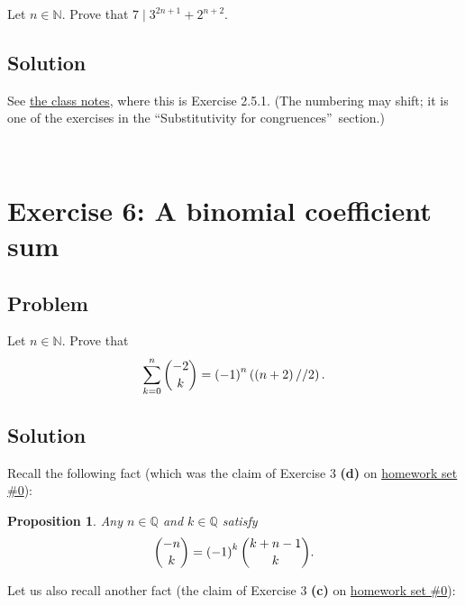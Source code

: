 \documentclass[paper=a4, fontsize=12pt]{scrartcl}%
\let\sumnonlimits\sum
\renewcommand{\sum}{\sumnonlimits\limits}
\theoremstyle{plainsl}
\newtheorem{proposition}[theorem]{Proposition}
\theoremstyle{definition}
\theoremstyle{remark}
\begin{document}
Let $n \in\mathbb{N}$. Prove that $7 \mid3^{2n+1} + 2^{n+2}$.

\subsection{Solution}

See \href{http://www-users.math.umn.edu/~dgrinber/19s/notes.pdf}{the class
notes}, where this is Exercise 2.5.1. (The numbering may shift; it is one of
the exercises in the \textquotedblleft Substitutivity for
congruences\textquotedblright\ section.)

\rule{0pt}{0.3pt} \\[0.4cm]

\section{Exercise 6: A binomial coefficient sum}

\subsection{Problem}

Let $n \in\mathbb{N}$. Prove that
\begin{align}
\sum_{k=0}^{n} \dbinom{-2}{k} = \left(  -1 \right)  ^{n} \left(  \left(  n+2
\right)  // 2 \right)  .
\end{align}


\subsection{Solution}

Recall the following fact (which was the claim of Exercise 3 \textbf{(d)} on
\href{http://www-users.math.umn.edu/~dgrinber/19s/hw0s.pdf}{homework set \#0}):

\begin{proposition}
\label{prop.sol.binom.-2choosek-sum.upneg}Any $n\in\mathbb{Q}$ and
$k\in\mathbb{Q}$ satisfy
\[
\dbinom{-n}{k}=\left(  -1\right)  ^{k}\dbinom{k+n-1}{k}.
\]

\end{proposition}

Let us also recall another fact (the claim of Exercise 3 \textbf{(c)} on
\href{http://www-users.math.umn.edu/~dgrinber/19s/hw0s.pdf}{homework set \#0}):
\end{document}
